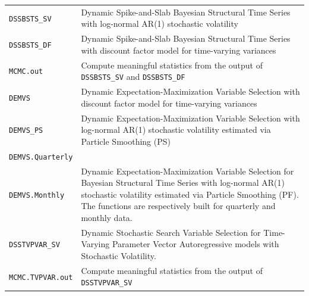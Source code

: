 \documentclass[
  12pt,
]{book}
\theoremstyle{break}
\theoremstyle{nonumberplain}
\begin{document}
\newpage
\begin{table}[h!]
\begin{tabularx}{\textwidth}{|l|X|}
\texttt{DSSBSTS\_SV}          & Dynamic Spike-and-Slab Bayesian Structural Time Series with log-normal AR(1) stochastic volatility \\
\texttt{DSSBSTS\_DF}          & Dynamic Spike-and-Slab Bayesian Structural Time Series with discount factor model for time-varying variances \\
\texttt{MCMC.out} & Compute meaningful statistics from the output of \texttt{DSSBSTS\_SV} and \texttt{DSSBSTS\_DF} \\
\texttt{DEMVS} & Dynamic Expectation-Maximization Variable Selection with discount factor model for time-varying variances \\
\texttt{DEMVS\_PS} & Dynamic Expectation-Maximization Variable Selection with log-normal AR(1) stochastic volatility estimated via Particle Smoothing (PS)\\
\texttt{DEMVS.Quarterly} \\ \texttt{DEMVS.Monthly} & Dynamic Expectation-Maximization Variable Selection for Bayesian Structural Time Series with log-normal AR(1) stochastic volatility estimated via Particle Smoothing (PF). The functions are respectively built for quarterly and monthly data.\\
\texttt{DSSTVPVAR\_SV} & Dynamic Stochastic Search Variable Selection for Time-Varying Parameter Vector Autoregressive models with Stochastic Volatility.\\
\texttt{MCMC.TVPVAR.out} & Compute meaningful statistics from the output of \texttt{DSSTVPVAR\_SV}\\
\end{tabularx}
\end{table}
\end{document}
